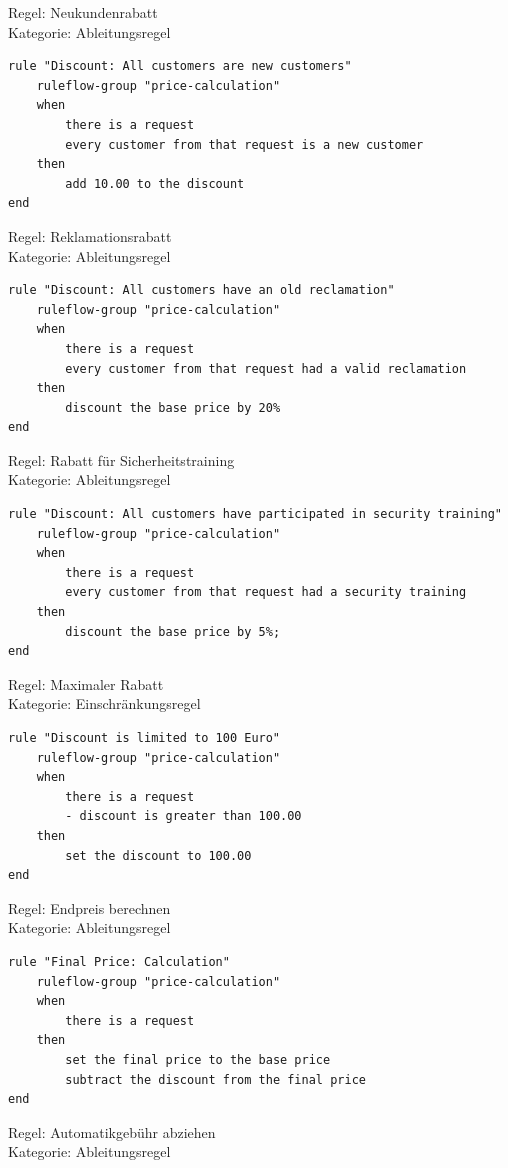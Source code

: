 Regel: Neukundenrabatt \\
Kategorie: Ableitungsregel

\begin{lstlisting}
rule "Discount: All customers are new customers"
	ruleflow-group "price-calculation"
	when
		there is a request
		every customer from that request is a new customer
	then
		add 10.00 to the discount
end
\end{lstlisting}

\newpage
Regel: Reklamationsrabatt \\
Kategorie: Ableitungsregel

\begin{lstlisting}
rule "Discount: All customers have an old reclamation"
	ruleflow-group "price-calculation"
	when
		there is a request
		every customer from that request had a valid reclamation
	then
		discount the base price by 20%
end
\end{lstlisting}

Regel: Rabatt für Sicherheitstraining \\
Kategorie: Ableitungsregel

\begin{lstlisting}
rule "Discount: All customers have participated in security training"
	ruleflow-group "price-calculation"
	when
		there is a request
		every customer from that request had a security training
	then
		discount the base price by 5%;
end
\end{lstlisting}

Regel: Maximaler Rabatt \\
Kategorie: Einschränkungsregel

\begin{lstlisting}
rule "Discount is limited to 100 Euro"
	ruleflow-group "price-calculation"
	when
		there is a request
		- discount is greater than 100.00
	then
		set the discount to 100.00
end
\end{lstlisting}

\newpage
Regel: Endpreis berechnen \\
Kategorie: Ableitungsregel

\begin{lstlisting}
rule "Final Price: Calculation"
	ruleflow-group "price-calculation"
	when
		there is a request
	then
		set the final price to the base price
		subtract the discount from the final price
end
\end{lstlisting}

Regel: Automatikgebühr abziehen \\
Kategorie: Ableitungsregel

